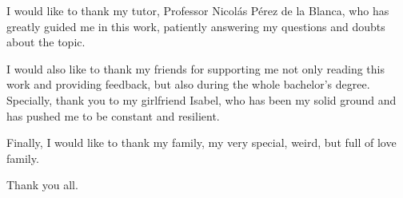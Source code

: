 I would like to thank my tutor, Professor Nicolás Pérez de la Blanca, who has greatly guided me in this work, patiently answering my questions and doubts about the topic.

I would also like to thank my friends for supporting me not only reading this work and providing feedback, but also during the whole bachelor's degree. Specially, thank you to my girlfriend Isabel, who has been my solid ground and has pushed me to be constant and resilient.  

Finally, I would like to thank my family, my very special, weird, but full of love family.

Thank you all.